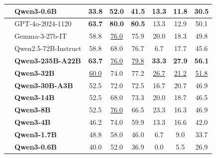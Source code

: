 \begin{table}[tbp]
{\begin{tabular}{clcccccc}
 & \textbf{Qwen3-0.6B} & 33.8 & 52.0 & 41.5 & 13.3 & 11.8 & 30.5 \\
\midrule
{} & GPT-4o-2024-1120 & \textbf{63.7} & \textbf{80.0} & \textbf{80.5} & 13.3 & 12.9 & 50.1 \\
 & Gemma-3-27b-IT & 58.8 & \underline{76.0} & 75.9 & 20.0 & 18.3 & 49.8 \\
 & Qwen2.5-72B-Instruct & 58.8 & 68.0 & 76.7 & 6.7 & 17.7 & 45.6 \\
 & \textbf{Qwen3-235B-A22B} & \textbf{63.7} & \underline{76.0} & \underline{79.8} & \textbf{33.3} & \textbf{27.9} & \textbf{56.1} \\
 & \textbf{Qwen3-32B} & \underline{60.0} & 74.0 & 77.2 & \underline{26.7} & \underline{21.2} & \underline{51.8} \\
 & \textbf{Qwen3-30B-A3B} & 52.5 & 72.0 & 72.5 & 16.7 & 20.7 & 46.9 \\
 & \textbf{Qwen3-14B} & 52.5 & 68.0 & 73.3 & 20.0 & 18.7 & 46.5 \\
 & \textbf{Qwen3-8B} & 52.5 & \underline{76.0} & 66.5 & 23.3 & 16.3 & 46.9 \\
 & \textbf{Qwen3-4B} & 46.2 & 74.0 & 59.9 & 13.3 & 16.6 & 42.0 \\
 & \textbf{Qwen3-1.7B} & 48.8 & 58.0 & 46.0 & 6.7 & 9.0 & 33.7 \\
 & \textbf{Qwen3-0.6B} & 40.0 & 52.0 & 36.9 & 0.0 & 5.5 & 26.9 \\
\bottomrule
\end{tabular}
}
\end{table}

